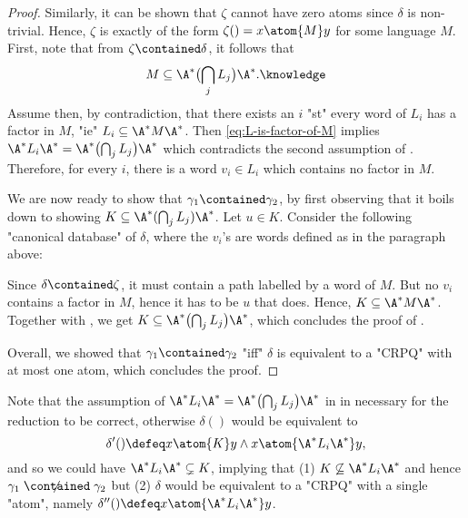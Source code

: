 \begin{proof}
		Similarly, it can be shown that $\zeta$ cannot have zero atoms since $\delta$ is non-trivial. 
		Hence, $\zeta$ is exactly of the form $\zeta() = x \atom{M} y$ for some language $M$.
		First, note that from $\zeta \contained \delta$, it follows that
		\begin{equation}
			M \subseteq \A^* \bigl( \bigcap_j L_j \bigr) \A^*.
			\AP\label{eq:L-is-factor-of-M}
		\end{equation}
		Assume then, by contradiction, that there
		exists an $i$ "st" every word of $L_i$ has a factor in $M$,
		"ie" $L_i \subseteq \A^* M \A^*$. Then \eqref{eq:L-is-factor-of-M} implies
		$\A^* L_i \A^* = \A^* \bigl( \bigcap_j L_j \bigr) \A^*$ which contradicts
		the second assumption of .
		Therefore, for every $i$, there is a word $v_i \in L_i$ which contains no factor in $M$.
		
		We are now ready to show that $\gamma_1 \contained \gamma_2$, by first observing that
		it boils down to showing $K \subseteq \A^* (\bigcap_j L_j ) \A^*$. Let $u \in K$.
		Consider the following "canonical database" of $\delta$, where the $v_i$'s are words
		defined as in the paragraph above:
		\begin{center}
		\end{center}
		Since $\delta \contained \zeta$, it must contain a path labelled by a word of $M$.
		But no $v_i$ contains a factor in $M$, hence it has to be $u$ that does.
		Hence, $K \subseteq \A^* M \A^*$. Together with
		, we get $K \subseteq \A^* \bigl( \bigcap_j L_j \bigr) \A^*$,
		which concludes the proof of .
	
		Overall, we showed that $\gamma_1 \contained \gamma_2$ "iff"
		$\delta$ is equivalent to a "CRPQ" with at most one atom, which concludes the proof.
\end{proof}

Note that the assumption of $\A^* L_i \A^* = \A^* \bigl( \bigcap_j L_j\bigr) \A^*$
in  in necessary for the reduction to be correct,
otherwise $\delta()$ would be equivalent to
\[\delta'() \defeq x \atom{K} y \land x \atom{\A^* L_i \A^*} y,\]
and so we could have $\A^* L_i \A^* \subsetneq K$, implying that
(1) $K \not\subseteq \A^* L_i \A^*$ and hence $\gamma_1 \centernot{\contained} \gamma_2$
but (2) $\delta$ would be equivalent to a "CRPQ" with a single "atom", namely
$\delta''() \defeq x\atom{\A^* L_i \A^*} y$.


